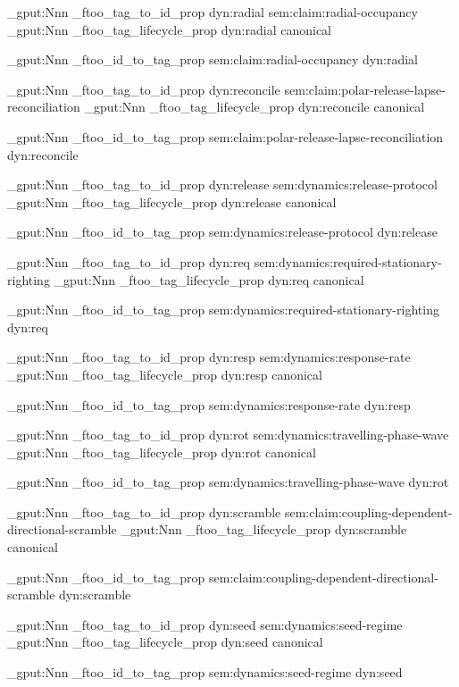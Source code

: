 \prop_gput:Nnn \g_ftoo_tag_to_id_prop { dyn:radial } { sem:claim:radial-occupancy }
\prop_gput:Nnn \g_ftoo_tag_lifecycle_prop { dyn:radial } { canonical }

\prop_gput:Nnn \g_ftoo_id_to_tag_prop { sem:claim:radial-occupancy } { dyn:radial }


\prop_gput:Nnn \g_ftoo_tag_to_id_prop { dyn:reconcile } { sem:claim:polar-release-lapse-reconciliation }
\prop_gput:Nnn \g_ftoo_tag_lifecycle_prop { dyn:reconcile } { canonical }

\prop_gput:Nnn \g_ftoo_id_to_tag_prop { sem:claim:polar-release-lapse-reconciliation } { dyn:reconcile }


\prop_gput:Nnn \g_ftoo_tag_to_id_prop { dyn:release } { sem:dynamics:release-protocol }
\prop_gput:Nnn \g_ftoo_tag_lifecycle_prop { dyn:release } { canonical }

\prop_gput:Nnn \g_ftoo_id_to_tag_prop { sem:dynamics:release-protocol } { dyn:release }


\prop_gput:Nnn \g_ftoo_tag_to_id_prop { dyn:req } { sem:dynamics:required-stationary-righting }
\prop_gput:Nnn \g_ftoo_tag_lifecycle_prop { dyn:req } { canonical }

\prop_gput:Nnn \g_ftoo_id_to_tag_prop { sem:dynamics:required-stationary-righting } { dyn:req }


\prop_gput:Nnn \g_ftoo_tag_to_id_prop { dyn:resp } { sem:dynamics:response-rate }
\prop_gput:Nnn \g_ftoo_tag_lifecycle_prop { dyn:resp } { canonical }

\prop_gput:Nnn \g_ftoo_id_to_tag_prop { sem:dynamics:response-rate } { dyn:resp }


\prop_gput:Nnn \g_ftoo_tag_to_id_prop { dyn:rot } { sem:dynamics:travelling-phase-wave }
\prop_gput:Nnn \g_ftoo_tag_lifecycle_prop { dyn:rot } { canonical }

\prop_gput:Nnn \g_ftoo_id_to_tag_prop { sem:dynamics:travelling-phase-wave } { dyn:rot }


\prop_gput:Nnn \g_ftoo_tag_to_id_prop { dyn:scramble } { sem:claim:coupling-dependent-directional-scramble }
\prop_gput:Nnn \g_ftoo_tag_lifecycle_prop { dyn:scramble } { canonical }

\prop_gput:Nnn \g_ftoo_id_to_tag_prop { sem:claim:coupling-dependent-directional-scramble } { dyn:scramble }


\prop_gput:Nnn \g_ftoo_tag_to_id_prop { dyn:seed } { sem:dynamics:seed-regime }
\prop_gput:Nnn \g_ftoo_tag_lifecycle_prop { dyn:seed } { canonical }

\prop_gput:Nnn \g_ftoo_id_to_tag_prop { sem:dynamics:seed-regime } { dyn:seed }


